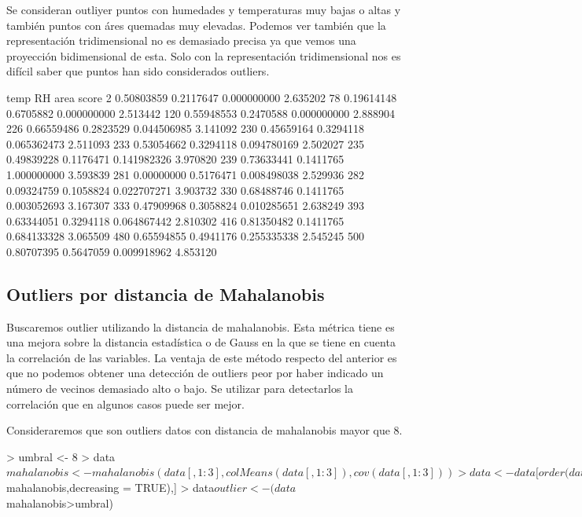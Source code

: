 \documentclass [a4paper] {article}
\begin{document}
Se consideran outliyer puntos con humedades y temperaturas muy bajas o altas y también puntos con áres quemadas muy elevadas.
Podemos ver también que la representación tridimensional no es demasiado precisa ya que vemos una proyección bidimensional de esta.
Solo con la representación tridimensional nos es difícil saber que puntos han sido considerados outliers.
\begin{center}
\begin{Schunk}
\begin{Soutput}
          temp        RH        area    score
2   0.50803859 0.2117647 0.000000000 2.635202
78  0.19614148 0.6705882 0.000000000 2.513442
120 0.55948553 0.2470588 0.000000000 2.888904
226 0.66559486 0.2823529 0.044506985 3.141092
230 0.45659164 0.3294118 0.065362473 2.511093
233 0.53054662 0.3294118 0.094780169 2.502027
235 0.49839228 0.1176471 0.141982326 3.970820
239 0.73633441 0.1411765 1.000000000 3.593839
281 0.00000000 0.5176471 0.008498038 2.529936
282 0.09324759 0.1058824 0.022707271 3.903732
330 0.68488746 0.1411765 0.003052693 3.167307
333 0.47909968 0.3058824 0.010285651 2.638249
393 0.63344051 0.3294118 0.064867442 2.810302
416 0.81350482 0.1411765 0.684133328 3.065509
480 0.65594855 0.4941176 0.255335338 2.545245
500 0.80707395 0.5647059 0.009918962 4.853120
\end{Soutput}
\end{Schunk}
\end{center}

\newpage
\subsection{Outliers por distancia de Mahalanobis}
Buscaremos outlier utilizando la distancia de mahalanobis.
Esta métrica tiene es una mejora sobre la distancia estadística o de Gauss en la que se tiene en cuenta la correlación de las variables.
La ventaja de este método respecto del anterior es que no podemos obtener una detección de outliers peor por haber indicado un número de vecinos demasiado alto o bajo.
Se utilizar para detectarlos la correlación que en algunos casos puede ser mejor.

Consideraremos que son outliers datos con distancia de mahalanobis mayor que 8.
\begin{Schunk}
\begin{Sinput}
> umbral <- 8
> data$mahalanobis <- mahalanobis(data[,1:3], colMeans(data[,1:3]), cov(data[,1:3]))
> data <- data[order(data$mahalanobis,decreasing = TRUE),]
> data$outlier <- (data$mahalanobis>umbral)
\end{Sinput}
\end{Schunk}
\end{document}
